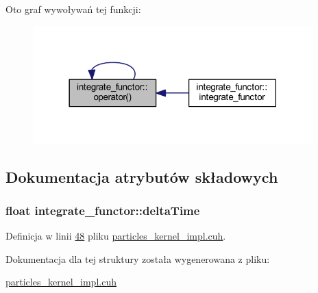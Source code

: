 Oto graf wywoływań tej funkcji\-:\nopagebreak
\begin{figure}[H]
\begin{center}
\leavevmode
\includegraphics[width=306pt]{structintegrate__functor_a772e86ead8690332beb50911e4448f81_icgraph}
\end{center}
\end{figure}




\subsection{Dokumentacja atrybutów składowych}
\hypertarget{structintegrate__functor_a06dce1826719cd5b2a9fdd9f566da754}{
\subsubsection[{delta\-Time}]{\setlength{\rightskip}{0pt plus 5cm}float integrate\-\_\-functor\-::delta\-Time}}\label{structintegrate__functor_a06dce1826719cd5b2a9fdd9f566da754}


Definicja w linii \hyperlink{particles__kernel__impl_8cuh_source_l00048}{48} pliku \hyperlink{particles__kernel__impl_8cuh_source}{particles\-\_\-kernel\-\_\-impl.\-cuh}.



Dokumentacja dla tej struktury została wygenerowana z pliku\-:\begin{DoxyCompactItemize}
\item 
\hyperlink{particles__kernel__impl_8cuh}{particles\-\_\-kernel\-\_\-impl.\-cuh}\end{DoxyCompactItemize}
